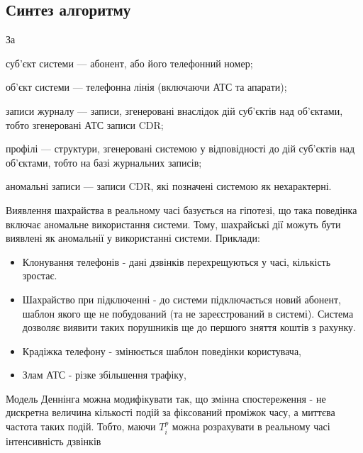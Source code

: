 \newpage
{}
\subsection{Синтез алгоритму}

За \cite{denning1987intrusion}  %

\begin{ESCDdescription}
\item суб'єкт системи --- абонент, або його телефонний номер;
\item об'єкт системи --- телефонна лінія (включаючи АТС та апарати);
\item записи журналу --- записи, згенеровані внаслідок дій суб'єктів над об'єктами, тобто згенеровані АТС записи CDR;
\item профілі --- структури, згенеровані системою у відповідності до дій суб'єктів над об'єктами, тобто на базі журнальних записів;
\item аномальні записи --- записи CDR, які позначені системою як нехарактерні.
\end{ESCDdescription}

Виявлення шахрайства в реальному часі базується на гіпотезі, що така поведінка включає аномальне використання системи. Тому, шахрайські дії можуть бути виявлені як аномальнії у використанні системи. Приклади: %

\begin{itemize}
  \item Клонування телефонів - дані дзвінків перехрещуються у часі, кількість зростає.
  \item Шахрайство при підключенні - до системи підключається новий абонент, шаблон якого ще не побудований (та не зареєстрований в системі). Система дозволяє виявити таких порушників ще до першого зняття коштів з рахунку.
  \item Крадіжка телефону - змінюється шаблон поведінки користувача,
  \item Злам АТС - різке збільшення трафіку,
\end{itemize}

Модель Деннінга \cite{denning1987intrusion} можна модифікувати так, що змінна спостереження - не дискретна величина кількості подій за фіксований проміжок часу, а миттєва частота таких подій. Тобто, маючи ${T_i^p}$ можна розрахувати в реальному часі інтенсивність дзвінків\TBD



